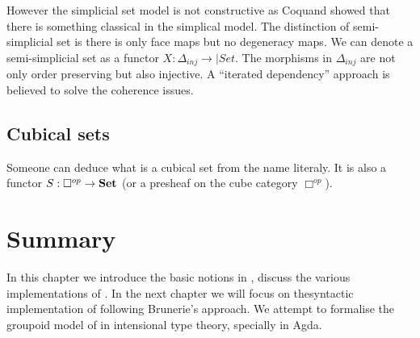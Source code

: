 However the simplicial set model is not constructive as Coquand showed
that there is something classical in the simplical model.
The distinction of semi-simplicial set is there is only face maps
but no degeneracy maps. We can denote a semi-simplicial set as a
functor $X : \Delta_{inj} \rightarrow |Set$. The morphisms in $\Delta_{inj}$ are not only order preserving
but also injective.
A “iterated dependency” approach is believed to solve the coherence
issues.



\subsection{Cubical sets}

Someone can deduce what is a cubical set from the name literaly. It is
also a functor $S : \Box^{op} \rightarrow \operatorname{\mathbf{Set}}$ (or a presheaf on the
cube category $ \Box^{op}$).

\section{Summary}

In this chapter we introduce the basic notions in \hott, discuss the
various implementations of \hott. In the next chapter we will focus on
thesyntactic implementation of \wog following
Brunerie's approach. We attempt to formalise the groupoid model of
\hott in intensional type theory, specially in Agda.

